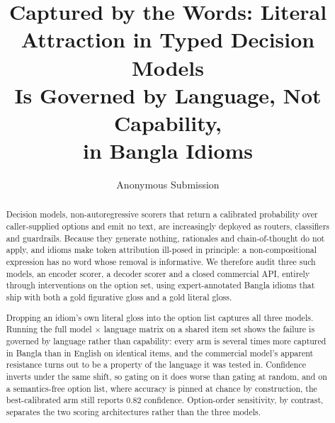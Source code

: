 \documentclass[11pt]{article}
\title{
    Captured by the Words: Literal Attraction in Typed Decision Models\\
    Is Governed by Language, Not Capability,\\
    in Bangla Idioms
}
\author{Anonymous Submission}
\begin{document}
\maketitle

\begin{abstract}
Decision models, non-autoregressive scorers that return a calibrated
probability over caller-supplied options and emit no text, are increasingly
deployed as routers, classifiers and guardrails. Because they generate nothing,
rationales and chain-of-thought do not apply, and idioms make token attribution
ill-posed in principle: a non-compositional expression has no word whose removal
is informative. We therefore audit three such models, an encoder scorer, a
decoder scorer and a closed commercial API, entirely through interventions on
the option set, using expert-annotated Bangla idioms that ship with both a gold
figurative gloss and a gold literal gloss.

Dropping an idiom's own literal gloss into the option list captures all three
models. Running the full model $\times$ language matrix on a shared item set
shows the failure is governed by language rather than capability: every arm is
several times more captured in Bangla than in English on identical items, and
the commercial model's apparent resistance turns out to be a property of the
language it was tested in. Confidence inverts under the same shift, so gating on
it does worse than gating at random, and on a semantics-free option list, where
accuracy is pinned at chance by construction, the best-calibrated arm still
reports $0.82$ confidence. Option-order sensitivity, by contrast, separates the
two scoring architectures rather than the three models.
\end{abstract}


\end{document}
